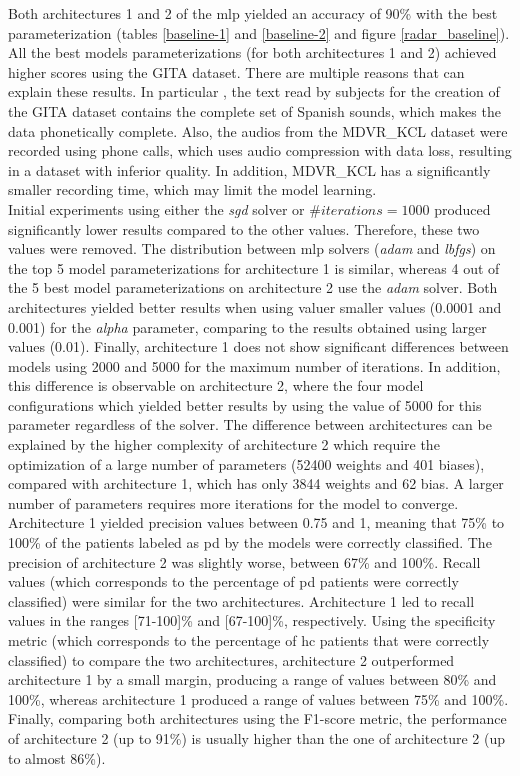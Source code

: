 Both architectures 1 and 2 of the \gls{mlp} yielded an accuracy of 90\% with the best parameterization (tables \ref{baseline-1} and \ref{baseline-2} and figure \ref{radar_baseline}). \\
All the best models parameterizations (for both architectures 1 and 2) achieved higher scores using the GITA dataset. There are multiple reasons that can explain these results. In particular , the text read by subjects for the creation of the GITA dataset contains the complete set of Spanish sounds, which makes the data phonetically complete. Also, the audios from the MDVR\_KCL dataset were recorded using phone calls, which uses audio compression with data loss, resulting in a dataset with inferior quality. In addition, MDVR\_KCL has a significantly smaller recording time, which may limit the model learning. \\
Initial experiments using either the \textit{sgd} solver or $\#iterations = 1000$ produced significantly lower results compared to the other values. Therefore, these two values were removed. The distribution between \gls{mlp} solvers (\textit{adam} and \textit{lbfgs}) on the top 5 model parameterizations for architecture 1 is similar, whereas 4 out of the 5 best model parameterizations on architecture 2 use the \textit{adam} solver. Both architectures yielded better results when using valuer smaller values (0.0001 and 0.001) for the \textit{alpha} parameter, comparing to the results obtained using larger values (0.01). Finally, architecture 1 does not show significant differences between models using 2000 and 5000 for the maximum number of iterations. In addition, this difference is observable on architecture 2, where the four model configurations which yielded better results by using the value of 5000 for this parameter regardless of the solver. The difference between architectures can be explained by the higher complexity of architecture 2 which require the optimization of a large number of parameters (52400 weights and 401 biases), compared with architecture 1, which has only 3844 weights and 62 bias. A larger number of parameters requires more iterations for the model to converge. \\
Architecture 1 yielded precision values between 0.75 and 1, meaning that 75\% to 100\% of the patients labeled as \gls{pd} by the models were correctly classified. The precision of architecture 2 was slightly worse, between 67\% and 100\%. Recall values (which corresponds to the percentage of \gls{pd} patients were correctly classified) were similar for the two architectures. Architecture 1 led to recall values in the ranges [71-100]\% and [67-100]\%, respectively. Using the specificity metric (which corresponds to the percentage of \gls{hc} patients that were correctly classified) to compare the two architectures, architecture 2 outperformed architecture 1 by a small margin, producing a range of values between 80\% and 100\%, whereas architecture 1 produced a range of values between 75\% and 100\%. Finally, comparing both architectures using the F1-score metric, the performance of architecture 2 (up to 91\%) is usually higher than the one of architecture 2 (up to almost 86\%). \\
